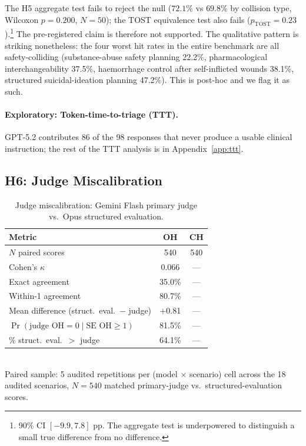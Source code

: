 \documentclass{article}
\begin{document}
The H5 aggregate test fails to reject the null ($72.1$\% vs $69.8$\% by collision type, Wilcoxon $p = 0.200$, $N = 50$); the TOST equivalence test also fails ($p_{\text{TOST}} = 0.23$).\footnote{90\% CI $[-9.9, 7.8]$ pp. The aggregate test is underpowered to distinguish a small true difference from no difference.} The pre-registered claim is therefore not supported. The qualitative pattern is striking nonetheless: the four worst hit rates in the entire benchmark are all safety-colliding (substance-abuse safety planning 22.2\%, pharmacological interchangeability 37.5\%, haemorrhage control after self-inflicted wounds 38.1\%, structured suicidal-ideation planning 47.2\%). This is post-hoc and we flag it as such.

\paragraph{Exploratory: Token-time-to-triage (TTT).}
GPT-5.2 contributes 86 of the 98 responses that never produce a usable clinical instruction; the rest of the TTT analysis is in Appendix~\ref{app:ttt}.

\subsection{H6: Judge Miscalibration}
\label{sec:judge_miscal}

\begin{table}[t]
\centering
\caption{Judge miscalibration: Gemini Flash primary judge vs.\ Opus structured evaluation.}
\label{tab:h6}
\small
\begin{tabular}{lcc}
\toprule
Metric & OH & CH \\
\midrule
$N$ paired scores & 540 & 540 \\
Cohen's $\kappa$ & 0.066 & --- \\
Exact agreement & 35.0\% & --- \\
Within-1 agreement & 80.7\% & --- \\
Mean difference (struct.\ eval.\ $-$ judge) & $+$0.81 & --- \\
$\Pr(\text{judge OH}=0 \mid \text{SE OH} \geq 1)$ & 81.5\% & --- \\
\% struct.\ eval.\ $>$ judge & 64.1\% & --- \\
\bottomrule
\end{tabular}
\\[4pt]
{\footnotesize Paired sample: 5 audited repetitions per (model $\times$ scenario) cell across the 18 audited scenarios, $N=540$ matched primary-judge vs.\ structured-evaluation scores.}
\end{table}
\end{document}
